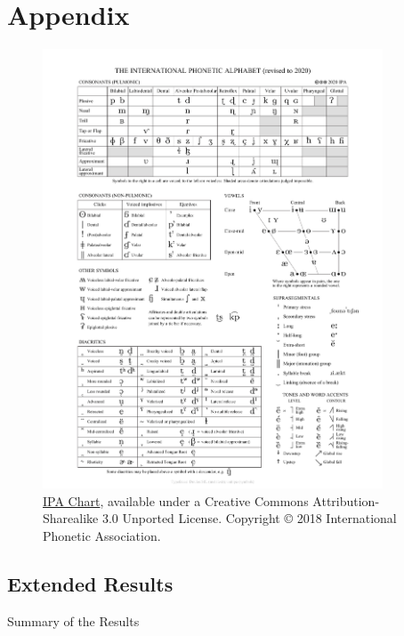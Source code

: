 \chapter{Appendix}\label{chapter:appendix}

\begin{figure}
    \centering
    \includegraphics[width=0.9\textwidth]{figures/IPA_unitipa_2020_full.pdf}
    \caption{\href{http://www.internationalphoneticassociation.org/content/ipa-chart}{IPA Chart}, available under a Creative Commons Attribution-Sharealike 3.0 Unported License. 
    Copyright © 2018 International Phonetic Association.}
    \label{fig:ipa_chart}
\end{figure}

\section{Extended Results}
\begin{table}[ht]
    \centering
    \resizebox{\textwidth}{!}{%
     
    }
    \caption{Summary of the Results}
    \label{tab:results-summary}
\end{table}

